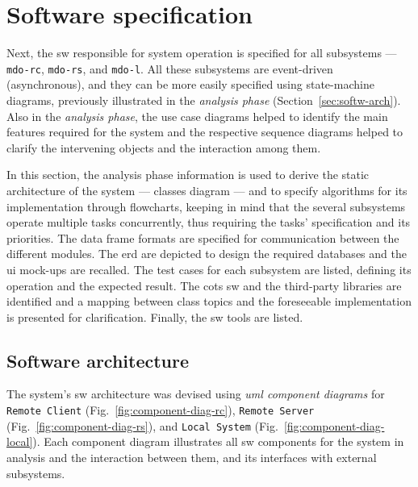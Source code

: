 %
\section{Software specification}
\label{sec:sw-specs}
Next, the \gls{sw} responsible for system operation is specified for all
subsystems --- \texttt{\gls{mdo-rc}}, \texttt{\gls{mdo-rs}}, and
\texttt{mdo-l}.
All these subsystems are event-driven (asynchronous), and they can be more easily
specified using state-machine diagrams, previously illustrated in the
\emph{analysis phase} (Section~\ref{sec:softw-arch}). Also in the \emph{analysis
phase}, the use case diagrams helped to identify the main features required for
the system and the respective sequence diagrams helped to clarify the
intervening objects and the interaction among them.

In this section, the analysis phase information is used to derive the static
architecture of the system --- classes diagram --- and to specify algorithms for
its implementation through flowcharts, keeping in mind that the several
subsystems operate multiple tasks concurrently, thus requiring the tasks'
specification and its priorities. The data frame formats are specified for
communication between the different modules. The \acrfull{erd} are depicted to
design the required databases and the \gls{ui} mock-ups are recalled. The test
cases for each subsystem are listed, defining its operation and the expected
result. The \gls{cots} \gls{sw} and the third-party libraries are identified
and a mapping between class topics and the foreseeable implementation is
presented for clarification. Finally, the \gls{sw} tools are listed.

\subsection{Software architecture}
\label{sec:softw-arch-1}
The system's \gls{sw} architecture was devised using \emph{\gls{uml} component
  diagrams} for \texttt{Remote Client} (Fig.~\ref{fig:component-diag-rc}), \texttt{Remote Server} (Fig.~\ref{fig:component-diag-rs}), and
\texttt{Local System} (Fig.~\ref{fig:component-diag-local}). Each component
diagram illustrates all \gls{sw} components for the system in analysis and the
interaction between them, and its
interfaces with external subsystems.


